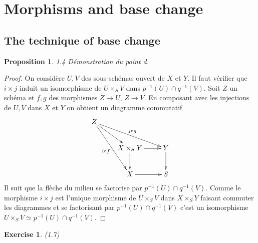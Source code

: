 \documentclass[A4, 11pt]{article}
\newtheorem{prop}[defin]{Proposition}
\newtheorem{exer}{Exercise}
\begin{document}
\section{Morphisms and base change}

\subsection{The technique of base change}

\begin{prop} 1.4 Démonstration du point d.
\end{prop}
 \begin{proof}
 On considère $U,V$ des sous-schémas ouvert de $X$ et $Y$. Il faut vérifier que $i\times j$ induit un isomorphisme de $U\times_S V$ dans $p^{-1}(U)\cap q^{-1}(V)$. Soit $Z$ un schéma et $f,g$ des morphismes $Z\rightarrow U$, $Z\rightarrow V$. En composant avec les injections de $U,V$ dans $X$ et $Y$ on obtient un diagramme commutatif
 $$\xymatrix{
Z \ar[dr] \ar[ddr]_{i\circ f} \ar[rrd]^{j\circ g} & & \\
& X\times_S Y \ar[r] \ar[d] & Y \ar[d]\\
 & X \ar[r] & S 
 }$$
 Il suit que la flèche du milieu se factorise par $p^{-1}(U)\cap q^{-1}(V)$. Comme le morphisme $i\times  j$ est l'unique morphisme de $U\times_S V$ dans $X\times_S Y$ faisant commuter les diagrammes et se factorisant par $p^{-1}(U)\cap q^{-1}(V)$ c'est un isomorphisme $U\times_S V\simeq p^{-1}(U)\cap q^{-1}(V)$.
 \end{proof}
 \begin{exer}(1.7)
 \end{exer}
\end{document}
